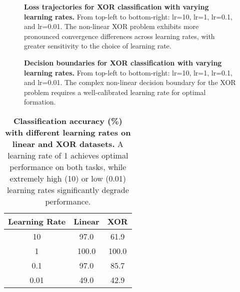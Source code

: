 \documentclass[twocolumn]{extarticle}
\begin{document}
\begin{figure}[H]
\caption{\textbf{Loss trajectories for XOR classification with varying learning rates.} From top-left to bottom-right: lr=10, lr=1, lr=0.1, and lr=0.01. The non-linear XOR problem exhibits more pronounced convergence differences across learning rates, with greater sensitivity to the choice of learning rate.}
\label{fig:loss_xor}
\end{figure}

\begin{figure}[H]
\caption{\textbf{Decision boundaries for XOR classification with varying learning rates.} From top-left to bottom-right: lr=10, lr=1, lr=0.1, and lr=0.01. The complex non-linear decision boundary for the XOR problem requires a well-calibrated learning rate for optimal formation.}
\label{fig:res_xor}
\end{figure}

\begin{table}[t]
\centering
\caption{\textbf{Classification accuracy (\%) with different learning rates on linear and XOR datasets.} A learning rate of 1 achieves optimal performance on both tasks, while extremely high (10) or low (0.01) learning rates significantly degrade performance.}
\label{tab:lr}
\begin{tabular}{@{}ccc@{}}
\toprule
\textbf{Learning Rate} & \textbf{Linear} & \textbf{XOR} \\ \midrule
10          & 97.0            & 61.9         \\
1           & 100.0           & 100.0        \\
0.1         & 97.0            & 85.7         \\
0.01        & 49.0            & 42.9         \\ \bottomrule
\end{tabular}
\end{table}
\end{document}
